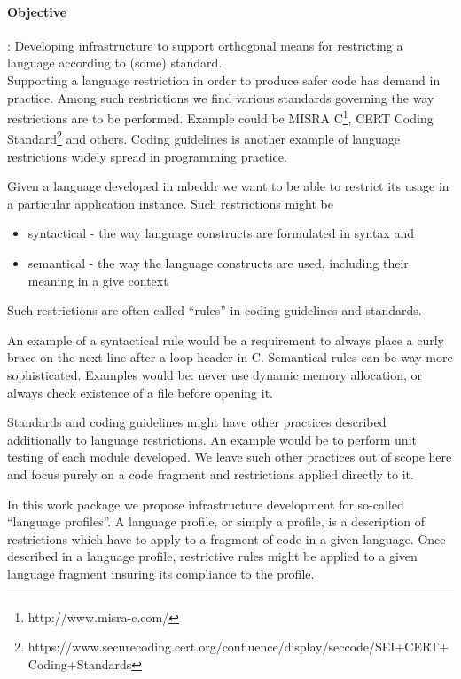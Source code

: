 \paragraph{\textbf{Objective}}: Developing infrastructure to support orthogonal
means for restricting a language according to (some) standard.\vspace{.2cm}\\
Supporting a language restriction in order to produce safer code has
demand in practice. Among such restrictions we find various standards
governing the way restrictions are to be performed. Example could be MISRA
C\footnote{http://www.misra-c.com/}, CERT Coding
Standard\footnote{https://www.securecoding.cert.org/confluence/display/seccode/SEI+CERT+Coding+Standards}
and others. Coding guidelines is another example of language restrictions 
widely spread in programming practice.

Given a language developed in mbeddr we want to be able to restrict its usage in
a particular application instance. Such restrictions might be
\begin{itemize}
  \item syntactical - the way language constructs are formulated in syntax and
  \item semantical - the way the language constructs are used, including their
  meaning in a give context
\end{itemize}

Such restrictions are often called ``rules'' in coding guidelines and standards. 

An example of a syntactical rule would be a requirement to always place a curly
brace on the next line after a loop header in C. Semantical rules can be way
more sophisticated. Examples would be: never use dynamic memory allocation, or
always check existence of a file before opening it.

Standards and coding guidelines might have other practices described
additionally to language restrictions. An example would be to
perform unit testing of each module developed. We leave such other practices out
of scope here and focus purely on a code fragment and restrictions applied
directly to it.

In this work package we propose infrastructure development for 
so-called ``language profiles''. A language profile, or simply a profile, is a
description of restrictions which have to apply to a fragment of code in a
given language. Once described in a language profile, restrictive rules might
be applied to a given language fragment insuring its compliance to the profile.

